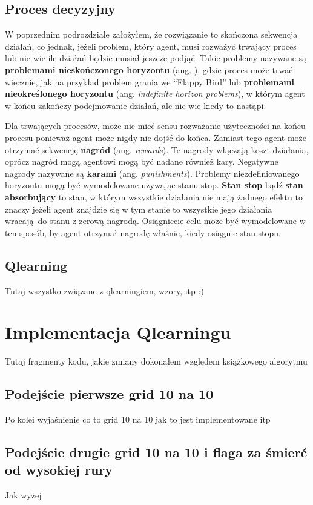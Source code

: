 \documentclass[a4paper,12pt,oneside]{book}
\begin{document}
\section{Proces decyzyjny}
W poprzednim podrozdziale założyłem, że rozwiązanie to skończona sekwencja
działań, co jednak, jeżeli problem, który agent, musi rozważyć trwający proces
lub nie wie ile działań będzie musiał jeszcze podjąć. Takie problemy nazywane
są \textbf{problemami nieskończonego horyzontu} (ang. ), gdzie proces może trwać wiecznie, jak na przykład problem grania
we ``Flappy Bird'' lub \textbf{problemami nieokreślonego horyzontu} (ang.
\textit{indefinite horizon problems}), w którym agent w końcu zakończy
podejmowanie działań, ale nie wie kiedy to nastąpi.

Dla trwających procesów, może nie mieć sensu rozważanie użyteczności na końcu
procesu ponieważ agent może nigdy nie dojść do końca. Zamiast tego agent może
otrzymać sekwencję \textbf{nagród} (ang. \textit{rewards}). Te nagrody włączają
koszt działania, oprócz nagród mogą agentowi mogą być nadane również kary.
Negatywne nagrody nazywane są \textbf{karami} (ang. \textit{punishments}).
Problemy niezdefiniowanego horyzontu mogą być wymodelowane używając stanu
stop. \textbf{Stan stop} bądź \textbf{stan absorbujący} to stan, w którym
wszystkie działania nie mają żadnego efektu to znaczy jeżeli agent znajdzie
się w tym stanie to wszystkie jego działania wracają do stanu z zerową nagrodą.
Osiągniecie celu może być wymodelowane w ten sposób, by agent otrzymał nagrodę
właśnie, kiedy osiągnie stan stopu.
\section{Q\dywiz learning}
Tutaj wszystko związane z qlearningiem, wzory, itp :)

\chapter{Implementacja Q\dywiz learningu}
\label{chapter:implementacja_qlearningu}
Tutaj fragmenty kodu, jakie zmiany dokonałem względem książkowego algorytmu
\section{Podejście pierwsze grid 10 na 10}
Po kolei wyjaśnienie co to grid 10 na 10 jak to jest implementowane itp
\section{Podejście drugie grid 10 na 10 i flaga za śmierć od wysokiej rury}
Jak wyżej
\end{document}
